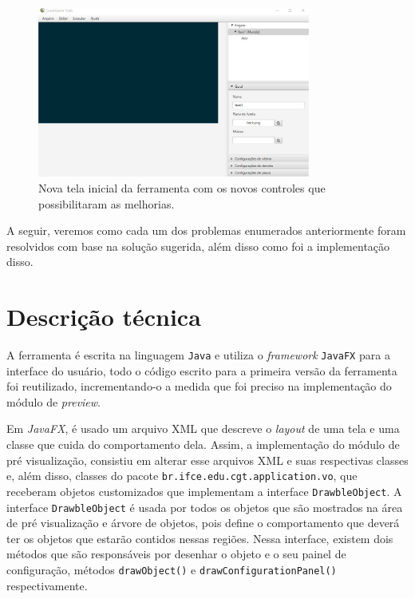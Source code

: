 \documentclass[12pt,twoside,openright,a4paper,english,brazil,sumario=tradicional]{abntex2}
\begin{document}
\begin{figure}[h]
\centering
\includegraphics[width=0.8\textwidth]{images/tela_inicial_2.jpg}
\caption{Nova tela inicial da ferramenta com os novos controles que possibilitaram as melhorias.}
\label{fig:tela_inicial_2}
\end{figure}

A seguir, veremos como cada um dos problemas enumerados anteriormente foram resolvidos com base na solução sugerida, além disso como foi a implementação disso.

\section{Descrição técnica}

 A ferramenta é escrita na linguagem \texttt{Java} e utiliza o \emph{framework} \texttt{JavaFX} para a interface do usuário, todo o código escrito para a primeira versão da ferramenta foi reutilizado, incrementando-o a medida que foi preciso na implementação do módulo de \textit{preview}.

Em \emph{JavaFX}, é usado um arquivo XML que descreve o \emph{layout} de uma tela e uma classe que cuida do comportamento dela. Assim, a implementação do módulo de pré visualização, consistiu em alterar esse arquivos XML e suas respectivas classes e, além disso, classes do pacote \texttt{br.ifce.edu.cgt.application.vo}, que receberam objetos customizados que implementam a interface \texttt{DrawbleObject}. A interface \texttt{DrawbleObject} é usada por todos os objetos que são mostrados na área de pré visualização e árvore de objetos, pois define o comportamento que deverá ter os objetos que estarão contidos nessas regiões. Nessa interface, existem dois métodos que são responsáveis por desenhar o objeto e o seu painel de configuração, métodos \texttt{drawObject()} e \texttt{drawConfigurationPanel()} respectivamente.
\end{document}

